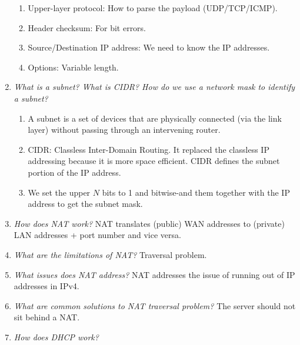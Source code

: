 \documentclass{article}
\begin{document}
\begin{enumerate}[label=\textit{(\roman*)}]
\begin{enumerate}
            \item Upper-layer protocol: How to parse the payload (UDP/TCP/ICMP).
            \item Header checksum: For bit errors.
            \item Source/Destination IP address: We need to know the IP addresses.
            \item Options: Variable length.
        \end{enumerate}
    \item \textit{What is a subnet? What is CIDR? How do we use a network mask to identify a subnet?}
        \begin{enumerate}
            \item A subnet is a set of devices that are physically connected (via the link layer) without
                passing through an intervening router.
            \item CIDR: Classless Inter-Domain Routing. It replaced the classless IP addressing because it 
                is more space efficient. CIDR defines the subnet portion of the IP address.
            \item We set the upper $N$ bits to 1 and bitwise-and them together with the IP address
                to get the subnet mask.
        \end{enumerate}
    \item \textit{How does NAT work?}
        \newline
        \newline
        NAT translates (public) WAN addresses to (private) LAN addresses + port number and vice versa.
    \item \textit{What are the limitations of NAT?}
        \newline
        \newline
        Traversal problem. 
    \item \textit{What issues does NAT address?}
        \newline
        \newline
        NAT addresses the issue of running out of IP addresses in IPv4. 
    \item \textit{What are common solutions to NAT traversal problem?}
        \newline
        \newline
        The server should not sit behind a NAT.
    \item \textit{How does DHCP work?}
        \newline
        \newline

\end{enumerate}
\end{document}
